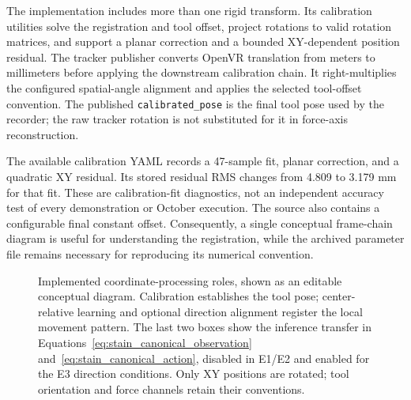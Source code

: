 The implementation includes more than one rigid transform. Its calibration utilities solve the registration and tool offset, project rotations to valid rotation matrices, and support a planar correction and a bounded XY-dependent position residual. The tracker publisher converts OpenVR translation from meters to millimeters before applying the downstream calibration chain. It right-multiplies the configured spatial-angle alignment and applies the selected tool-offset convention. The published \texttt{calibrated\_pose} is the final tool pose used by the recorder; the raw tracker rotation is not substituted for it in force-axis reconstruction.

The available calibration YAML records a 47-sample fit, planar correction, and a quadratic XY residual. Its stored residual RMS changes from 4.809 to 3.179 mm for that fit. These are calibration-fit diagnostics, not an independent accuracy test of every demonstration or October execution. The source also contains a configurable final constant offset. Consequently, a single conceptual frame-chain diagram is useful for understanding the registration, while the archived parameter file remains necessary for reproducing its numerical convention.

\begin{figure}[tbp]\centering
{}
\caption[Coordinate-processing and direction-transfer chain]{Implemented coordinate-processing roles, shown as an editable conceptual diagram. Calibration establishes the tool pose; center-relative learning and optional direction alignment register the local movement pattern. The last two boxes show the inference transfer in Equations~\eqref{eq:stain_canonical_observation} and~\eqref{eq:stain_canonical_action}, disabled in E1/E2 and enabled for the E3 direction conditions. Only XY positions are rotated; tool orientation and force channels retain their conventions.}
\label{fig:demo_transfer}
\end{figure}


